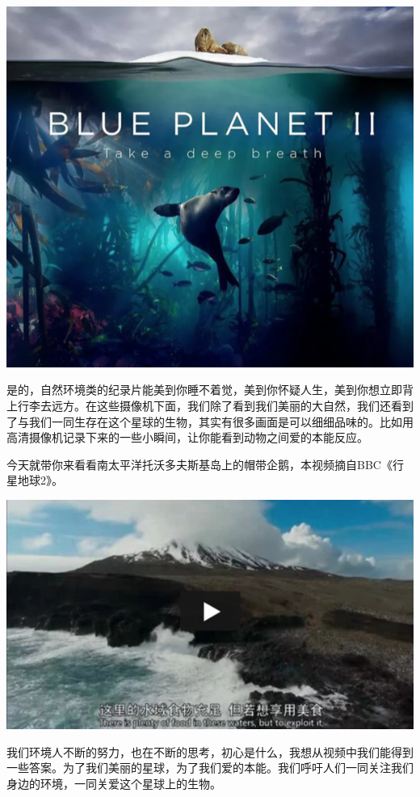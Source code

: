\documentclass[]{book}
\begin{document}
\includegraphics[width=8.33in]{images/xf4}

是的，自然环境类的纪录片能美到你睡不着觉，美到你怀疑人生，美到你想立即背上行李去远方。在这些摄像机下面，我们除了看到我们美丽的大自然，我们还看到了与我们一同生存在这个星球的生物，其实有很多画面是可以细细品味的。比如用高清摄像机记录下来的一些小瞬间，让你能看到动物之间爱的本能反应。

今天就带你来看看南太平洋托沃多夫斯基岛上的帽带企鹅，本视频摘自BBC《行星地球2》。

\includegraphics[width=8.33in]{images/xf5}

我们环境人不断的努力，也在不断的思考，初心是什么，我想从视频中我们能得到一些答案。为了我们美丽的星球，为了我们爱的本能。我们呼吁人们一同关注我们身边的环境，一同关爱这个星球上的生物。
\end{document}

